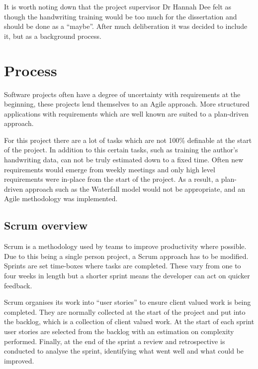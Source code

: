 It is worth noting down that the project supervisor Dr Hannah Dee felt as though the handwriting training would be too much for the dissertation and should be done as a ``maybe''. After much deliberation it was decided to include it, but as a background process.

\section{Process}
Software projects often have a degree of uncertainty with requirements at the beginning, these projects lend themselves to an Agile approach. More structured applications with requirements which are well known are suited to a plan-driven approach.

For this project there are a lot of tasks which are not 100\% definable at the start of the project. In addition to this certain tasks, such as training the author's handwriting data, can not be truly estimated down to a fixed time. Often new requirements would emerge from weekly meetings and only high level requirements were in-place from the start of the project. As a result, a plan-driven approach such as the Waterfall model would not be appropriate, and an Agile methodology was implemented.

\subsection{Scrum overview}
Scrum \cite{citeulike:14014350} is a methodology used by teams to improve productivity where possible. Due to this being a single person project, a Scrum approach has to be modified. Sprints are set time-boxes where tasks are completed. These vary from one to four weeks in length but a shorter sprint means the developer can act on quicker feedback.

Scrum organises its work into ``user stories'' to ensure client valued work is being completed. They are normally collected at the start of the project and put into the backlog, which is a collection of client valued work. At the start of each sprint user stories are selected from the backlog with an estimation on complexity performed. Finally, at the end of the sprint a review and retrospective is conducted to analyse the sprint, identifying what went well and what could be improved.

